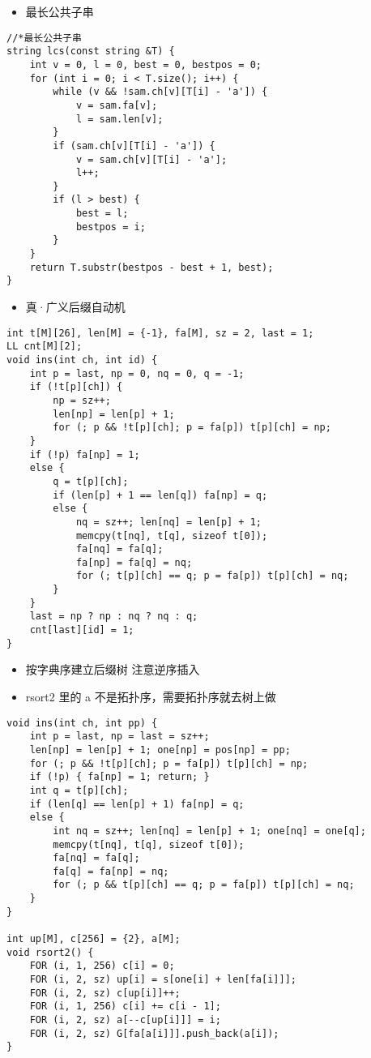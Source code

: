 \documentclass[]{article}
\providecommand{\tightlist}{%
  \setlength{\itemsep}{0pt}\setlength{\parskip}{0pt}}
\begin{document}
\begin{itemize}
\tightlist
\item
  最长公共子串
\end{itemize}

\begin{verbatim}
//*最长公共子串
string lcs(const string &T) {
    int v = 0, l = 0, best = 0, bestpos = 0;
    for (int i = 0; i < T.size(); i++) {
        while (v && !sam.ch[v][T[i] - 'a']) {
            v = sam.fa[v];
            l = sam.len[v];
        }   
        if (sam.ch[v][T[i] - 'a']) {
            v = sam.ch[v][T[i] - 'a'];
            l++;
        }
        if (l > best) {
            best = l;
            bestpos = i;
        }
    }
    return T.substr(bestpos - best + 1, best);
}
\end{verbatim}

\begin{itemize}
\tightlist
\item
  真·广义后缀自动机
\end{itemize}

\begin{verbatim}
int t[M][26], len[M] = {-1}, fa[M], sz = 2, last = 1;
LL cnt[M][2];
void ins(int ch, int id) {
    int p = last, np = 0, nq = 0, q = -1;
    if (!t[p][ch]) {
        np = sz++;
        len[np] = len[p] + 1;
        for (; p && !t[p][ch]; p = fa[p]) t[p][ch] = np;
    }
    if (!p) fa[np] = 1;
    else {
        q = t[p][ch];
        if (len[p] + 1 == len[q]) fa[np] = q;
        else {
            nq = sz++; len[nq] = len[p] + 1;
            memcpy(t[nq], t[q], sizeof t[0]);
            fa[nq] = fa[q];
            fa[np] = fa[q] = nq;
            for (; t[p][ch] == q; p = fa[p]) t[p][ch] = nq;
        }
    }
    last = np ? np : nq ? nq : q;
    cnt[last][id] = 1;
}
\end{verbatim}

\begin{itemize}
\tightlist
\item
  按字典序建立后缀树 注意逆序插入
\item
  rsort2 里的 a 不是拓扑序，需要拓扑序就去树上做
\end{itemize}

\begin{verbatim}
void ins(int ch, int pp) {
    int p = last, np = last = sz++;
    len[np] = len[p] + 1; one[np] = pos[np] = pp;
    for (; p && !t[p][ch]; p = fa[p]) t[p][ch] = np;
    if (!p) { fa[np] = 1; return; }
    int q = t[p][ch];
    if (len[q] == len[p] + 1) fa[np] = q;
    else {
        int nq = sz++; len[nq] = len[p] + 1; one[nq] = one[q];
        memcpy(t[nq], t[q], sizeof t[0]);
        fa[nq] = fa[q];
        fa[q] = fa[np] = nq;
        for (; p && t[p][ch] == q; p = fa[p]) t[p][ch] = nq;
    }
}

int up[M], c[256] = {2}, a[M];
void rsort2() {
    FOR (i, 1, 256) c[i] = 0;
    FOR (i, 2, sz) up[i] = s[one[i] + len[fa[i]]];
    FOR (i, 2, sz) c[up[i]]++;
    FOR (i, 1, 256) c[i] += c[i - 1];
    FOR (i, 2, sz) a[--c[up[i]]] = i;
    FOR (i, 2, sz) G[fa[a[i]]].push_back(a[i]);
}
\end{verbatim}
\end{document}
